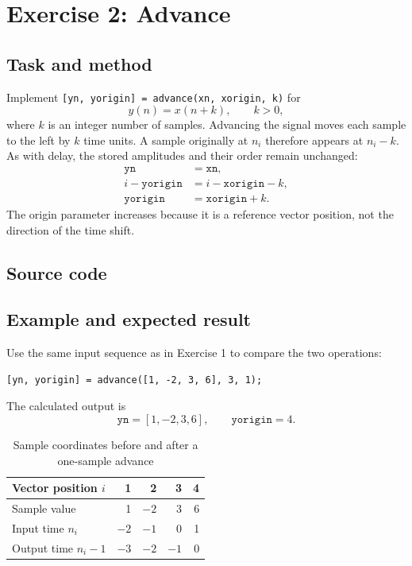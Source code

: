 \section{Exercise 2: Advance}
\subsection{Task and method}
Implement \texttt{[yn, yorigin] = advance(xn, xorigin, k)} for
\begin{equation}
  y(n)=x(n+k),\qquad k>0,
\end{equation}
where $k$ is an integer number of samples. Advancing the signal moves
each sample to the left by $k$ time units. A sample originally at $n_i$
therefore appears at $n_i-k$. As with delay, the stored amplitudes and
their order remain unchanged:
\begin{align}
  \texttt{yn} &= \texttt{xn},\\
  i-\texttt{yorigin} &= i-\texttt{xorigin}-k,\\
  \texttt{yorigin} &= \texttt{xorigin}+k.
\end{align}
The origin parameter increases because it is a reference vector position,
not the direction of the time shift.

\subsection{Source code}


\subsection{Example and expected result}
Use the same input sequence as in Exercise 1 to compare the two operations:
\begin{lstlisting}[numbers=none]
[yn, yorigin] = advance([1, -2, 3, 6], 3, 1);
\end{lstlisting}
The calculated output is
\[
  \texttt{yn}=[1,-2,3,6],\qquad \texttt{yorigin}=4.
\]
\begin{table}[H]
  \centering
  \caption{Sample coordinates before and after a one-sample advance}
  \label{tab:advance}
  \begin{tabular}{lrrrr}
    \toprule
    Vector position $i$ & 1 & 2 & 3 & 4\\
    \midrule
    Sample value & 1 & $-2$ & 3 & 6\\
    Input time $n_i$ & $-2$ & $-1$ & 0 & 1\\
    Output time $n_i-1$ & $-3$ & $-2$ & $-1$ & 0\\
    \bottomrule
  \end{tabular}
\end{table}

